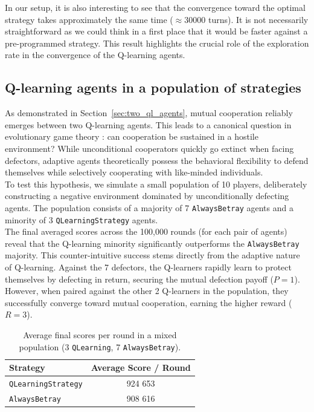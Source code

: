 \documentclass[11pt, a4paper]{article}
\begin{document}
In our setup, it is also interesting to see that the convergence toward the optimal strategy takes approximately the same time ($\approx 30000$ turns). It is not necessarily straightforward as we could think in a first place that it would be faster against a pre-programmed strategy. This result highlights the crucial role of the exploration rate in the convergence of the Q-learning agents. \\

\subsection{Q-learning agents in a population of strategies}
\label{sec:ql_agents_population}

As demonstrated in Section~\ref{sec:two_ql_agents}, mutual cooperation reliably emerges between two Q-learning agents. This leads to a canonical question in evolutionary game theory \citep{axelrod1984}: can cooperation be sustained in a hostile environment? While unconditional cooperators quickly go extinct when facing defectors, adaptive agents theoretically possess the behavioral flexibility to defend themselves while selectively cooperating with like-minded individuals. \\

To test this hypothesis, we simulate a small population of 10 players, deliberately constructing a negative environment dominated by unconditionally defecting agents. The population consists of a majority of 7 \texttt{AlwaysBetray} agents and a minority of 3 \texttt{QLearningStrategy} agents. \\

The final averaged scores across the 100,000 rounds (for each pair of agents) reveal that the Q-learning minority significantly outperforms the \texttt{AlwaysBetray} majority. This counter-intuitive success stems directly from the adaptive nature of Q-learning. Against the 7 defectors, the Q-learners rapidly learn to protect themselves by defecting in return, securing the mutual defection payoff ($P=1$). However, when paired against the other 2 Q-learners in the population, they successfully converge toward mutual cooperation, earning the higher reward ($R=3$). \\

\begin{table}[H]
  \centering
  \caption{Average final scores per round in a mixed population (3 \texttt{QLearning}, 7 \texttt{AlwaysBetray}).}
  \label{tab:population_scores}
  \begin{tabular}{lc}
    \toprule
    \textbf{Strategy} & \textbf{Average Score / Round} \\
    \midrule
    \texttt{QLearningStrategy} & 924 653  \\
    \texttt{AlwaysBetray}      & 908 616 \\
    \bottomrule
  \end{tabular}
\end{table}
\end{document}
